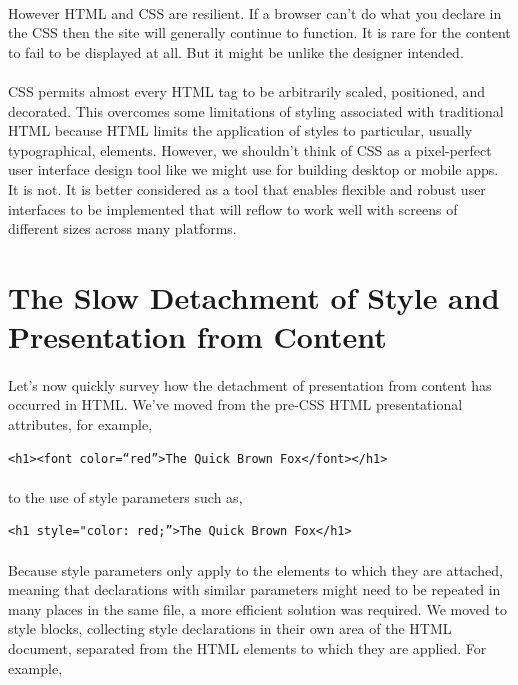 \paragraph{} However HTML and CSS are resilient. If a browser can’t do what you declare in the CSS then the site will generally continue to function. It is rare for the content to fail to be displayed at all. But it might be unlike the designer intended.
\paragraph{} CSS permits almost every HTML tag to be arbitrarily scaled, positioned, and decorated. This overcomes some limitations of styling associated with traditional HTML because HTML limits the application of styles to particular, usually typographical, elements. However, we shouldn't think of CSS as a pixel-perfect user interface design tool like we might use for building desktop or mobile apps. It is not. It is better considered as a tool that enables flexible and robust user interfaces to be implemented that will reflow to work well with screens of different sizes across many platforms.



\section{The Slow Detachment of Style and Presentation from Content}
\paragraph{} Let's now quickly survey how the detachment of presentation from content has occurred in HTML. We've moved from the pre-CSS HTML presentational attributes, for example,

\begin{lstlisting}
<h1><font color=“red”>The Quick Brown Fox</font></h1>
\end{lstlisting}

\paragraph{} to the use of style parameters such as,

\begin{lstlisting}
<h1 style="color: red;”>The Quick Brown Fox</h1>
\end{lstlisting}

\paragraph{} Because style parameters only apply to the elements to which they are attached, meaning that declarations with similar parameters might need to be repeated in many places in the same file, a more efficient solution was required. We moved to style blocks, collecting style declarations in their own area of the HTML document, separated from the HTML elements to which they are applied. For example,

